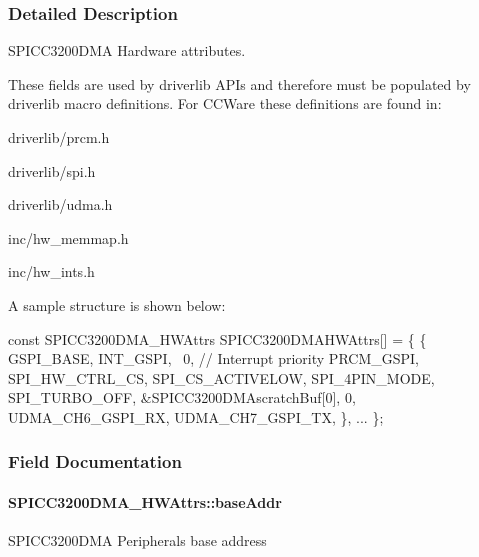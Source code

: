 \subsubsection{Detailed Description}
S\+P\+I\+C\+C3200\+D\+M\+A Hardware attributes. 

These fields are used by driverlib A\+P\+Is and therefore must be populated by driverlib macro definitions. For C\+C\+Ware these definitions are found in\+:
\begin{DoxyItemize}
\item driverlib/prcm.\+h
\item driverlib/spi.\+h
\item driverlib/udma.\+h
\item inc/hw\+\_\+memmap.\+h
\item inc/hw\+\_\+ints.\+h
\end{DoxyItemize}

A sample structure is shown below\+: 
\begin{DoxyCode}
\textcolor{keyword}{const} SPICC3200DMA_HWAttrs SPICC3200DMAHWAttrs[] = \{
    \{
        GSPI\_BASE,
        INT\_GSPI,
        ~0,         \textcolor{comment}{// Interrupt priority}
        PRCM\_GSPI,
        SPI\_HW\_CTRL\_CS,
        SPI\_CS\_ACTIVELOW,
        SPI\_4PIN\_MODE,
        SPI\_TURBO\_OFF,
        &SPICC3200DMAscratchBuf[0],
        0,
        UDMA\_CH6\_GSPI\_RX,
        UDMA\_CH7\_GSPI\_TX,
    \},
    ...
\};
\end{DoxyCode}
 

\subsubsection{Field Documentation}
\paragraph[{base\+Addr}]{ S\+P\+I\+C\+C3200\+D\+M\+A\+\_\+\+H\+W\+Attrs\+::base\+Addr}\label{struct_s_p_i_c_c3200_d_m_a___h_w_attrs_a9c8d969d44a09aad6ed1682708147793}
S\+P\+I\+C\+C3200\+D\+M\+A Peripheral\textquotesingle{}s base address 
